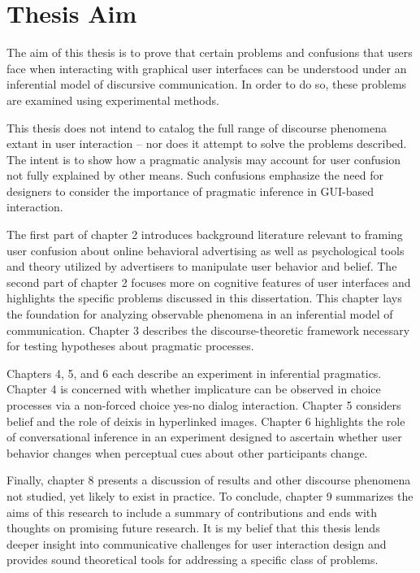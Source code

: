 \section{Thesis Aim}
\label{thesisaim}

The aim of this thesis is to prove that certain problems and confusions that users face when interacting with graphical user interfaces can be understood under an inferential model of discursive communication. In order to do so, these problems are examined using experimental methods.

This thesis does not intend to catalog the full range of discourse phenomena extant in user interaction -- nor does it attempt to solve the problems described. The intent is to show how a pragmatic analysis may account for user confusion not fully explained by other means. Such confusions emphasize the need for designers to consider the importance of pragmatic inference in GUI-based interaction.

The first part of chapter 2 introduces background literature relevant to framing user confusion about online behavioral advertising as well as psychological tools and theory utilized by advertisers to manipulate user behavior and belief. The second part of chapter 2 focuses more on cognitive features of user interfaces and highlights the specific problems discussed in this dissertation. This chapter lays the foundation for analyzing observable phenomena in an inferential model of communication. Chapter 3 describes the discourse-theoretic framework necessary for testing hypotheses about pragmatic processes. 

Chapters 4, 5, and 6 each describe an experiment in inferential pragmatics. Chapter 4 is concerned with whether implicature can be observed in choice processes via a non-forced choice yes-no dialog interaction. Chapter 5 considers belief and the role of deixis in hyperlinked images. Chapter 6 highlights the role of conversational inference in an experiment designed to ascertain whether user behavior changes when perceptual cues about other participants change. 

Finally, chapter 8 presents a discussion of results and other discourse phenomena not studied, yet likely to exist in practice. To conclude, chapter 9 summarizes the aims of this research to include a summary of contributions and ends with thoughts on promising future research. It is my belief that this thesis lends deeper insight into communicative challenges for user interaction design and provides sound theoretical tools for addressing a specific class of problems.
